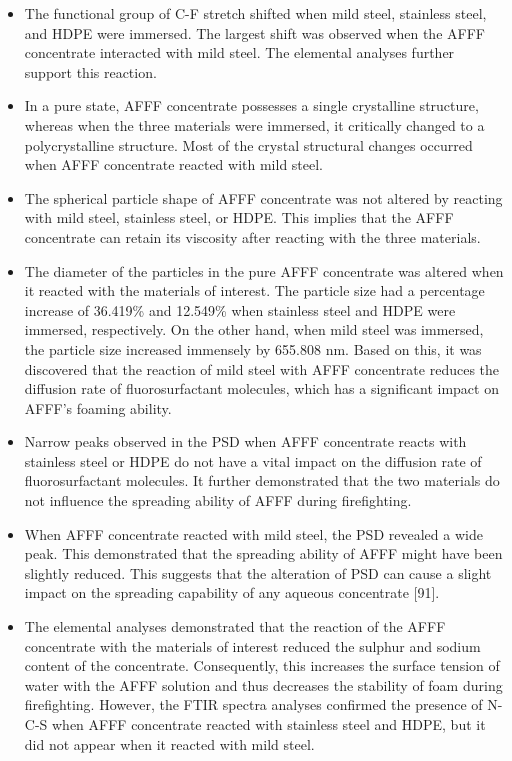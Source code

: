 \documentclass[12pt]{report}
\begin{document}
\begin{itemize}
    \item The functional group of C-F stretch shifted when mild steel, stainless steel, and HDPE were immersed. The largest shift was observed when the AFFF concentrate interacted with mild steel. The elemental analyses further support this reaction.
    \item In a pure state, AFFF concentrate possesses a single crystalline structure, whereas when the three materials were immersed, it critically changed to a polycrystalline structure. Most of the crystal structural changes occurred when AFFF concentrate reacted with mild steel. 
    \item The spherical particle shape of AFFF concentrate was not altered by reacting with mild steel, stainless steel, or HDPE. This implies that the AFFF concentrate can retain its viscosity after reacting with the three materials.
    \item The diameter of the particles in the pure AFFF concentrate was altered when it reacted with the materials of interest. The particle size had a percentage increase of 36.419\% and 12.549\% when stainless steel and HDPE were immersed, respectively. On the other hand, when mild steel was immersed, the particle size increased immensely by 655.808 nm. Based on this, it was discovered that the reaction of mild steel with AFFF concentrate reduces the diffusion rate of fluorosurfactant molecules, which has a significant impact on AFFF's foaming ability. 
    \item Narrow peaks observed in the PSD when AFFF concentrate reacts with stainless steel or HDPE do not have a vital impact on the diffusion rate of fluorosurfactant molecules. It further demonstrated that the two materials do not influence the spreading ability of AFFF during firefighting.
    \item When AFFF concentrate reacted with mild steel, the PSD revealed a wide peak. This demonstrated that the spreading ability of AFFF might have been slightly reduced. This suggests that the alteration of PSD can cause a slight impact on the spreading capability of any aqueous concentrate [91].
    \item The elemental analyses demonstrated that the reaction of the AFFF concentrate with the materials of interest reduced the sulphur and sodium content of the concentrate. Consequently, this increases the surface tension of water with the AFFF solution and thus decreases the stability of foam during firefighting. However, the FTIR spectra analyses confirmed the presence of N-C-S when AFFF concentrate reacted with stainless steel and HDPE, but it did not appear when it reacted with mild steel.

\end{itemize}
\end{document}
